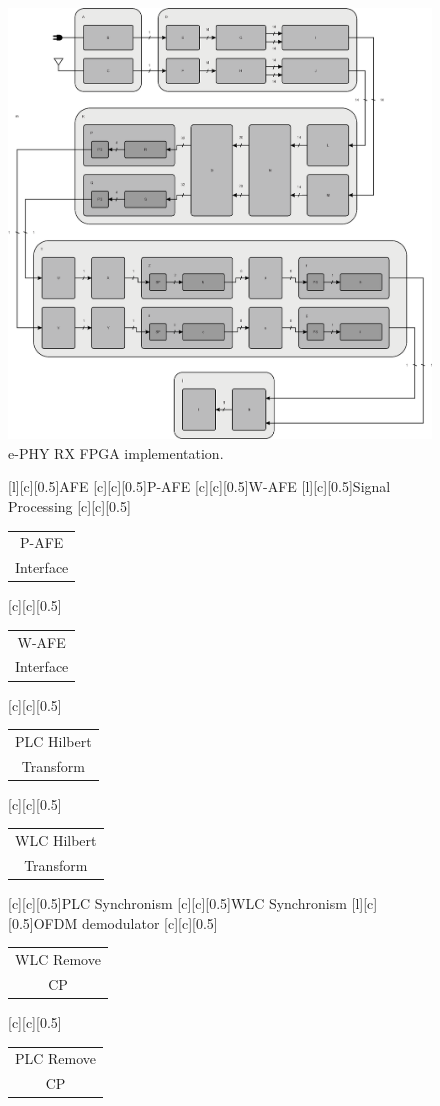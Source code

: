 \documentclass[mathserif]{beamer}
\begin{document}
\begin{frame}
\begin{overprint}
{\begin{figure}[htb]
				\includegraphics[width=0.50\linewidth]{figuras/phy_rx}
				\caption{e-PHY RX FPGA implementation.}
			\end{figure}
		}
		{
			\renewcommand{\sizeLetter}{0.5}
			\begin{figure}[htb]
				\centering
				[l][c][\sizeLetter]{AFE}
				[c][c][\sizeLetter]{P-AFE}
				[c][c][\sizeLetter]{W-AFE}
				[l][c][\sizeLetter]{Signal Processing}
				[c][c][\sizeLetter]{\begin{tabular}{c}
						P-AFE\\Interface
				\end{tabular}}
				[c][c][\sizeLetter]{\begin{tabular}{c}
						W-AFE\\Interface
				\end{tabular}}
				[c][c][\sizeLetter]{\begin{tabular}{c}
						PLC Hilbert\\Transform
				\end{tabular}}
				[c][c][\sizeLetter]{\begin{tabular}{c}
						WLC Hilbert\\Transform
				\end{tabular}}
				[c][c][\sizeLetter]{PLC Synchronism}
				[c][c][\sizeLetter]{WLC Synchronism}
				[l][c][\sizeLetter]{OFDM demodulator}
				[c][c][\sizeLetter]{\begin{tabular}{c}
						WLC Remove\\CP
				\end{tabular}}
				[c][c][\sizeLetter]{\begin{tabular}{c}
						PLC Remove\\CP
				\end{tabular}}

\end{figure}}
\end{overprint}
\end{frame}
\end{document}
